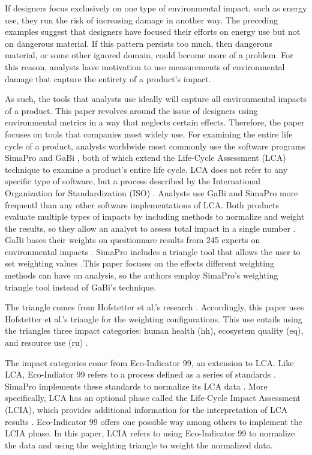 \documentclass[final,journal,10pt,letterpaper,oneside,twocolumn,compsoc]%
{IEEEtran}
\begin{document}
If designers focus exclusively on one type of environmental impact,
such as energy use, they run the risk of increasing damage in another way. The
preceding examples suggest that designers have focused their efforts on energy
use but not on dangerous material. If this pattern persists too much, then
dangerous material, or some other ignored domain, could become more of a
problem. For this reason, analysts have motivation to use measurements of
environmental damage that capture the entirety of a product's impact.

As such, the tools that analysts use ideally will capture all environmental
impacts of a product. This paper revolves around the issue of designers
using environmental metrics in a way that neglects certain effects. Therefore,
the paper focuses on tools that companies most widely use. For examining the
entire life cycle of a product, analysts worldwide most commonly use the
software programs SimaPro and GaBi \cite{hermann}, both of which extend the
Life-Cycle Assessment (LCA) technique to examine a product's entire life cycle.
LCA does not refer to any specific type of software, but a process described by
the International Organization for Standardization (ISO) \cite{14040}
\cite{14044}. Analysts use GaBi and SimaPro more frequentl than any other
software implementations of LCA. Both products evaluate
multiple types of impacts by including methods to normalize and weight the
results, so they allow an analyst to assess total impact in a single number
\cite{gabi} \cite{simapro}. GaBi bases their weights on questionnare results
from 245 experts on environmental impacts \cite{gabi}. SimaPro includes a
triangle tool that allows the user to set weighting values \cite{simapro}.This
paper focuses on the effects different weighting methods can have on
analysis, so the authors employ SimaPro's weighting triangle tool instead of
GaBi's technique.

The triangle comes from Hofstetter et al.'s research \cite{triangle}.
Accordingly, this paper uses Hofstetter et al.'s triangle for the weighting
configurations. This use entails using the triangles three impact categories:
human health (hh), ecosystem quality (eq), and resource use (ru)
\cite{triangle}.

The impact categories come from Eco-Indicator 99, an extension to LCA. Like LCA,
Eco-Indiator 99 refers to a process defined as a series of standards \cite{pre}.
SimaPro implements these standards to normalize its LCA data \cite{simapro}.
More specifically, LCA has an optional phase called the Life-Cycle Impact
Assessment (LCIA), which provides additional information for the interpretation
of LCA results \cite{14044}. Eco-Indicator 99 offers one possible way among
others to implement the LCIA phase. In this paper, LCIA refers to using
Eco-Indicator 99 to normalize the data and using the weighting triangle to
weight the normalized data.
\end{document}
